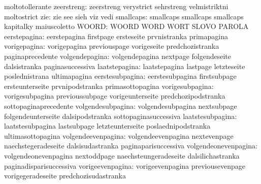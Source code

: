                            moltotollerante
               zeerstreng: zeerstreng                verystrict
                           sehrstreng                velmistriktni
                           moltostrict               %
                      zie: zie                       see
                           sieh                      viz
                           vedi
                smallcaps: smallcaps                 smallcaps
                           smallcaps                 kapitalky
                           maiuscoletto
                    WOORD: WOORD                     WORD
                           WORT                      SLOVO
                           PAROLA
             eerstepagina: eerstepagina              firstpage
                           ersteseite                prvnistranka
                           primapagina
             vorigepagina: vorigepagina              previouspage
                           vorigeseite               predchozistranka
                           paginaprecedente
           volgendepagina: volgendepagina            nextpage
                           folgendeseite             dalsistranka
                           paginasuccessiva
            laatstepagina: laatstepagina             lastpage
                           letzteseite               poslednistrana
                           ultimapagina
          eerstesubpagina: eerstesubpagina           firstsubpage
                           ersteunterseite           prvnipodstranka
                           primasottopagina
          vorigesubpagina: vorigesubpagina           previoussubpage
                           vorigeunterseite          predchozipodstranka
                           sottopaginaprecedente
        volgendesubpagina: volgendesubpagina         nextsubpage
                           folgendeunterseite        dalsipodstranka
                           sottopaginasuccessiva
         laatstesubpagina: laatstesubpagina          lastsubpage
                           letzteunterseite          poslaednipodstranka
                           ultimasottopagina
       volgendeevenpagina: volgendeevenpagina        nextevenpage
                           naechstegeradeseite       dalsisudastranka
                           paginaparisuccessiva
     volgendeonevenpagina: volgendeonevenpagina      nextoddpage
                           naechsteungeradeseite     dalsilichastranka
                           paginadisparisuccessiva
         vorigeevenpagina: vorigeevenpagina          previousevenpage
                           vorigegeradeseite         predchozisudastranka
